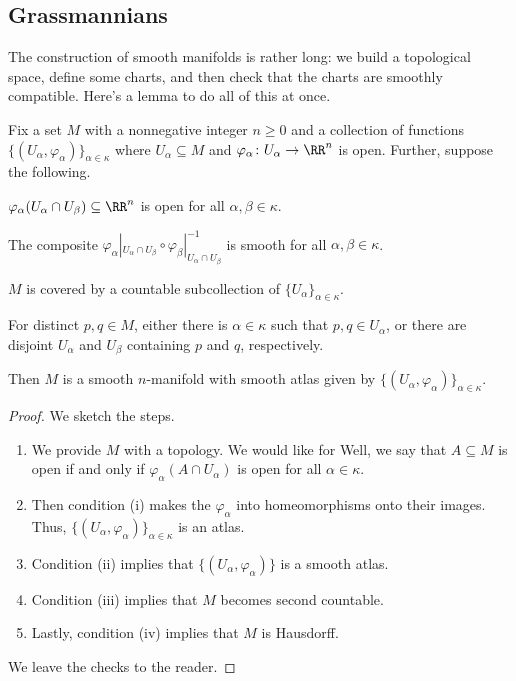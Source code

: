 \documentclass[../notes.tex]{subfiles}
\begin{document}
\subsection{Grassmannians}
The construction of smooth manifolds is rather long: we build a topological space, define some charts, and then check that the charts are smoothly compatible. Here's a lemma to do all of this at once.
\begin{lemma} \label{lem:build-manifold-from-set}
	Fix a set $M$ with a nonnegative integer $n\ge0$ and a collection of functions $\{(U_\alpha,\varphi_\alpha)\}_{\alpha\in\kappa}$ where $U_\alpha\subseteq M$ and $\varphi_\alpha\colon U_\alpha\to\RR^n$ is open. Further, suppose the following.
	\begin{listroman}
		\item $\varphi_\alpha(U_\alpha\cap U_\beta)\subseteq\RR^n$ is open for all $\alpha,\beta\in\kappa$.
		\item The composite $\varphi_\alpha|_{U_\alpha\cap U_\beta}\circ\varphi_\beta|_{U_\alpha\cap U_\beta}^{-1}$ is smooth for all $\alpha,\beta\in\kappa$.
		\item $M$ is covered by a countable subcollection of $\{U_\alpha\}_{\alpha\in\kappa}$.
		\item For distinct $p,q\in M$, either there is $\alpha\in\kappa$ such that $p,q\in U_\alpha$, or there are disjoint $U_\alpha$ and $U_\beta$ containing $p$ and $q$, respectively.
	\end{listroman}
	Then $M$ is a smooth $n$-manifold with smooth atlas given by $\{(U_\alpha,\varphi_\alpha)\}_{\alpha\in\kappa}$.
\end{lemma}
\begin{proof}
	We sketch the steps.
	\begin{enumerate}
		\item We provide $M$ with a topology. We would like for Well, we say that $A\subseteq M$ is open if and only if $\varphi_\alpha(A\cap U_\alpha)$ is open for all $\alpha\in\kappa$.
		\item Then condition (i) makes the $\varphi_\alpha$ into homeomorphisms onto their images. Thus, $\{(U_\alpha,\varphi_\alpha)\}_{\alpha\in\kappa}$ is an atlas.
		\item Condition (ii) implies that $\{(U_\alpha,\varphi_\alpha)\}$ is a smooth atlas.
		\item Condition (iii) implies that $M$ becomes second countable.
		\item Lastly, condition (iv) implies that $M$ is Hausdorff.
	\end{enumerate}
	We leave the checks to the reader.
\end{proof}
\end{document}
